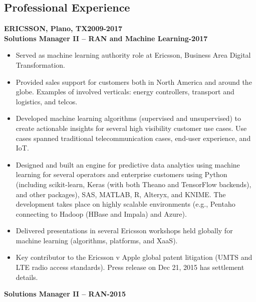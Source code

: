 \documentclass{article}
\begin{document}
\subsection*{\sc \centering Professional Experience}
\textbf{ERICSSON, Plano, TX\hfill 2009-2017}\\
\textbf{Solutions Manager II -- RAN and Machine Learning\hfill{}-2017}
\begin{itemize}
\item Served as machine learning authority role at Ericsson, Business Area Digital Transformation. 
\item Provided sales support for customers both in North America and around the globe. Examples of involved verticals: energy controllers, transport and logistics, and telcos. 
\item Developed machine learning algorithms (supervised and unsupervised) to create actionable insights for several high visibility customer use cases. Use cases spanned traditional telecommunication cases, end-user experience, and IoT. 
\item Designed and built an engine for predictive data analytics using machine learning for several operators and enterprise customers using Python (including scikit-learn, Keras (with both Theano and TensorFlow backends), and other packages), SAS, MATLAB, R, Alteryx, and KNIME.  The development takes place on highly scalable environments (e.g., Pentaho connecting to Hadoop (HBase and Impala) and Azure). 
\item Delivered presentations in several Ericsson workshops held globally for machine learning (algorithms, platforms, and XaaS). 
\item Key contributor to the Ericsson v Apple global patent litigation (UMTS and LTE radio access standards). Press release on Dec 21, 2015 has settlement details. 
\end{itemize}
\textbf{Solutions Manager II -- RAN\hfill{}-2015}
\end{document}
